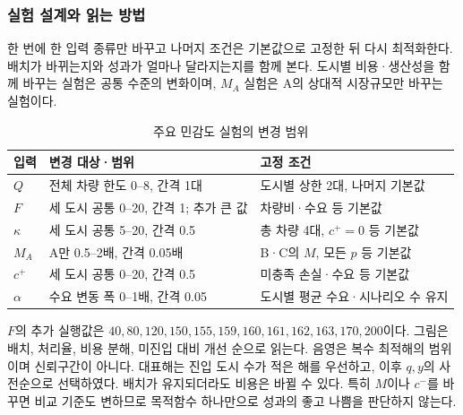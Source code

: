 \documentclass[10pt,a4paper]{article}
\begin{document}
\subsubsection{실험 설계와 읽는 방법}
한 번에 한 입력 종류만 바꾸고 나머지 조건은 기본값으로 고정한 뒤 다시 최적화한다.
배치가 바뀌는지와 성과가 얼마나 달라지는지를 함께 본다.
도시별 비용·생산성을 함께 바꾸는 실험은 공통 수준의 변화이며,
$M_A$ 실험은 A의 상대적 시장규모만 바꾸는 실험이다.
\begin{table}[H]
\centering\small
\caption{주요 민감도 실험의 변경 범위}\label{tab:sc-sensitivity-design}
\begin{tabular}{lP{.48\linewidth}P{.35\linewidth}}
\toprule
입력 & 변경 대상·범위 & 고정 조건\\\midrule
$Q$ & 전체 차량 한도 0--8, 간격 1대 & 도시별 상한 2대, 나머지 기본값\\
$F$ & 세 도시 공통 0--20, 간격 1; 추가 큰 값 & 차량비·수요 등 기본값\\
$\kappa$ & 세 도시 공통 5--20, 간격 0.5 & 총 차량 4대, $c^+=0$ 등 기본값\\
$M_A$ & A만 0.5--2배, 간격 0.05배 & B·C의 $M$, 모든 $p$ 등 기본값\\
$c^+$ & 세 도시 공통 0--20, 간격 0.5 & 미충족 손실·수요 등 기본값\\
$\alpha$ & 수요 변동 폭 0--1배, 간격 0.05 & 도시별 평균 수요·시나리오 수 유지\\
\bottomrule
\end{tabular}
\end{table}
$F$의 추가 실행값은 $40,80,120,150,155,159,160,161,162,163,170,200$이다.
그림은 배치, 처리율, 비용 분해, 미진입 대비 개선 순으로 읽는다.
음영은 복수 최적해의 범위이며 신뢰구간이 아니다.
대표해는 진입 도시 수가 적은 해를 우선하고, 이후 $q,y$의 사전순으로 선택하였다.
배치가 유지되더라도 비용은 바뀔 수 있다. 특히 $M$이나 $c^-$를 바꾸면 비교 기준도 변하므로
목적함수 하나만으로 성과의 좋고 나쁨을 판단하지 않는다.
\end{document}
